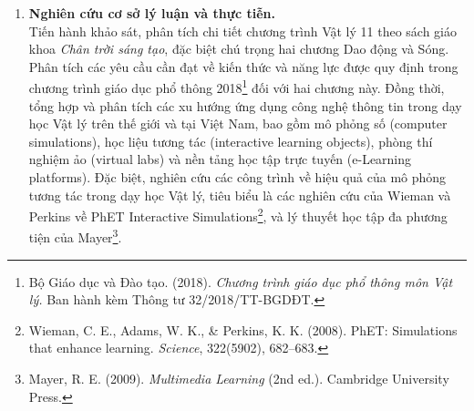 \begin{enumerate}
    \item \textbf{Nghiên cứu cơ sở lý luận và thực tiễn.} \\
    Tiến hành khảo sát, phân tích chi tiết chương trình Vật lý 11 theo sách giáo khoa \textit{Chân trời sáng tạo}, đặc biệt chú trọng hai chương Dao động và Sóng. Phân tích các yêu cầu cần đạt về kiến thức và năng lực được quy định trong chương trình giáo dục phổ thông 2018\footnote{Bộ Giáo dục và Đào tạo. (2018). \textit{Chương trình giáo dục phổ thông môn Vật lý.} Ban hành kèm Thông tư 32/2018/TT-BGDĐT.} đối với hai chương này. Đồng thời, tổng hợp và phân tích các xu hướng ứng dụng công nghệ thông tin trong dạy học Vật lý trên thế giới và tại Việt Nam, bao gồm mô phỏng số (computer simulations), học liệu tương tác (interactive learning objects), phòng thí nghiệm ảo (virtual labs) và nền tảng học tập trực tuyến (e-Learning platforms). Đặc biệt, nghiên cứu các công trình về hiệu quả của mô phỏng tương tác trong dạy học Vật lý, tiêu biểu là các nghiên cứu của Wieman và Perkins về PhET Interactive Simulations\footnote{Wieman, C. E., Adams, W. K., \& Perkins, K. K. (2008). PhET: Simulations that enhance learning. \textit{Science}, 322(5902), 682–683.}, và lý thuyết học tập đa phương tiện của Mayer\footnote{Mayer, R. E. (2009). \textit{Multimedia Learning} (2nd ed.). Cambridge University Press.}.


\end{enumerate}
